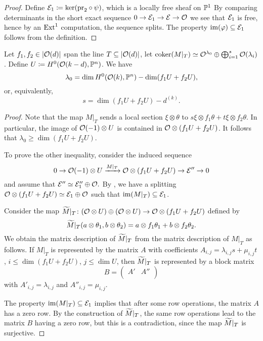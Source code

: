 \begin{proof}
	Define $\mathcal{E}_1 \coloneqq \ker(\mathrm{pr}_2\circ\psi)$, which is a locally free sheaf on $\mathbb{P}^1$ By comparing determinants in the short exact sequence $0 \to \mathcal{E}_1 \to \mathcal{E} \to \mathcal{O}$ we see that $\mathcal{E}_1$ is free, hence by an $\operatorname{Ext}^1$ computation, the sequence splits. The property $\operatorname{im}(\varphi) \subseteq \mathcal{E}_1$ follows from the definition.
\end{proof}

\begin{proposition} \label{number-zeroes}
	Let $f_1, f_2 \in \lvert\mathcal{O}(d)\rvert$ span the line
	$T \subseteq \lvert\mathcal{O}(d)\rvert$, let $\operatorname{coker}(M|_{T}) \simeq \mathcal{O}^{\lambda_0}
	\oplus \bigoplus_{i=1}^s \mathcal{O}(\lambda_i)$. Define $U\coloneqq H^0(\mathcal{O}(k-d),\mathbb{P}^n)$. We have $$\lambda_0 = \dim H^0(\mathcal{O}(k),\mathbb{P}^n) - \dim ({f_1 U + f_2 U}),$$
	or, equivalently,
	\[
		s = \dim({f_1 U + f_2 U}) - d^{(k)}.
	\]
\end{proposition}

\begin{proof}
	Note that the map $M|_T$ sends a local section $\xi \otimes \theta$ to $s\xi \otimes f_1 \theta + t\xi \otimes f_2 \theta$. In particular, the image of $\mathcal{O}(-1)\otimes U$ is contained in $\mathcal{O} \otimes (f_1 U + f_2 U)$. It follows that $\lambda_0 \geq \dim ({f_1 U + f_2 U})$.

  To prove the other inequality, consider the induced sequence
  \[
  	0 \to \mathcal{O}(-1)\otimes U \xrightarrow{M|_T} \mathcal{O}\otimes (f_1 U + f_2 U) \to \mathcal{E}'' \to 0
  \]
  and assume that $\mathcal{E}'' \simeq \mathcal{E}_1''\oplus \mathcal{O}.$ By , we have a splitting $\mathcal{O}\otimes (f_1 U + f_2 U) \simeq \mathcal{E}_1 \oplus \mathcal{O}$ such that $\operatorname{im}(M|_T) \subseteq \mathcal{E}_1$. 

  Consider the map
  $\widetilde M|_T \colon (\mathcal{O} \otimes U) \oplus (\mathcal{O} \otimes U) \to \mathcal{O} \otimes (f_1 U + f_2 U)$
  defined by $$\widetilde M|_T(a\otimes \theta_1,b \otimes \theta_2)=a\otimes f_1 \theta_1 + b \otimes f_2 \theta_2.$$
  We obtain the matrix description of $\widetilde M|_T$ from the matrix description of $M|_T$ as follows. If $M|_T$ is represented by the matrix $A$ with coefficients $A_{i,j} = \lambda_{i,j} s + \mu_{i,j} t$, $i\leq \dim (f_1 U + f_2 U)$, $j\leq \dim U$, then $\widetilde M|_T$ is represented by a block matrix
  \[
  	B = \left(
  		\begin{array}{c|c}
  			A' & A'' \\
  		\end{array}
  	\right)
  \]
  with $A'_{i,j} = \lambda_{i,j}$ and $A''_{i,j} = \mu_{i,j}$.

  The property $\operatorname{im}(M|_T)\subseteq \mathcal{E}_1$ implies that after some row operations, the matrix $A$ has a zero row. By the construction of $\widetilde M|_T$, the same row operations lead to the matrix $B$ having a zero row, but this is a contradiction, since the map $\widetilde M|_T$ is surjective.
\end{proof}

